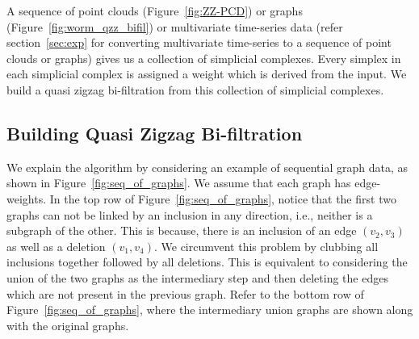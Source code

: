 \documentclass{article}
\newcommand{\zzgril}{\textsc{Zz-Gril}}
\newcommand{\zz}{\mathbb{ZZ}}
\newcommand{\z}{\mathbb{Z}}
\theoremstyle{plain}
\theoremstyle{definition}
\theoremstyle{remark}
\begin{document}


A sequence of point clouds (Figure~\ref{fig:ZZ-PCD}) or graphs (Figure~\ref{fig:worm_qzz_bifil}) or multivariate time-series data (refer section~\ref{sec:exp} for converting multivariate time-series to a sequence of point clouds or graphs) gives us a collection of simplicial complexes. Every simplex in each simplicial complex is assigned a weight which is derived from the input. We build a quasi zigzag bi-filtration from this collection of simplicial complexes.


\subsection{Building Quasi Zigzag Bi-filtration}
\label{sec:building_qzz_bifil}
We explain the algorithm by considering an example of sequential graph data, as shown in Figure~\ref{fig:seq_of_graphs}. We assume that each graph has edge-weights. In the top row of Figure~\ref{fig:seq_of_graphs}, notice that the first two graphs can not be linked by an inclusion in any direction, i.e., neither is a subgraph of the other. This is because, there is an inclusion of an edge $(v_2,v_3)$ as well as a deletion $(v_1,v_4)$. We circumvent this problem by clubbing all inclusions together followed by all deletions. This is equivalent to considering the union of the two graphs as the intermediary step and then deleting the edges which are not present in the previous graph. Refer to the bottom row of Figure~\ref{fig:seq_of_graphs}, where the intermediary union graphs are shown along with the original graphs. 
\end{document}
